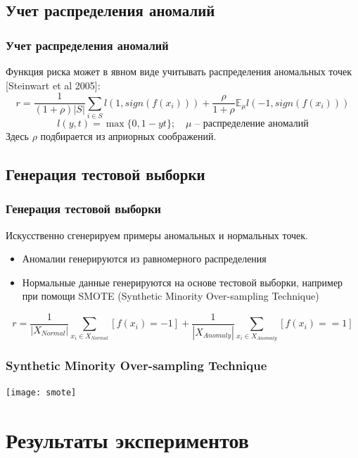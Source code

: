\documentclass[10pt,pdf]{beamer}
\begin{document}
\subsection{Учет распределения аномалий}
\begin{frame}\frametitle{Учет распределения аномалий}
Функция риска может в явном виде учитывать распределения аномальных точек [Steinwart et al 2005]:
\[
r = \frac{1}{(1 + \rho)|S|}\sum\limits_{i\in S}l(1, sign(f(x_i))) + \frac{\rho}{1 + \rho} \mathbb{E}_{\mu}l(-1, sign(f(x_i)))
\]
\[
l(y, t) = \max\{0, 1 - yt\};  \quad \mu \text{ -- распределение аномалий}
\]
Здесь $\rho$ подбирается из априорных соображений.
\end{frame}
\subsection{Генерация тестовой выборки}
\begin{frame}\frametitle{Генерация тестовой выборки}
Искусственно сгенерируем примеры аномальных и нормальных точек.
\begin{itemize}
\item Аномалии генерируются из равномерного распределения
\item Нормальные данные генерируются на основе тестовой выборки, например при помощи SMOTE (Synthetic Minority Over-sampling Technique)
\end{itemize}
\[
r = \dfrac{1}{|X_{Normal}|}\sum_{x_i\in X_{Normal}} [f(x_i) = -1] + \dfrac{1}{|X_{Anomaly}|}\sum_{x_i \in X_{Anomaly}} [f(x_i) == 1]
\]
\end{frame}





\begin{frame}\frametitle{Synthetic Minority Over-sampling Technique}
\texttt{[image: smote]}
\end{frame}
\section{Результаты экспериментов}
\end{document}
